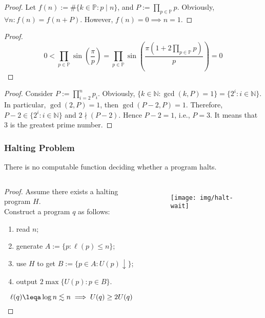\documentclass[UTF8,aspectratio=43,11pt,colorlinks,compress,openany]{beamer}%
\begin{document}
\begin{frame}\frametitle{}
\begin{proof}
Let $f(n):=\#\{k\in\mathbb{P}: p\mid n\}$, and $P:=\prod\limits_{p\in\mathbb{P}} p$. Obviously, $\forall n: f(n)=f(n+P)$. However, $f(n)=0\implies n=1$.
\end{proof}
\begin{proof}
\[0<\prod\limits_{p\in\mathbb{P}}\sin\left(\frac{\pi}{p}\right)=\prod\limits_{p\in\mathbb{P}}\sin\left(\frac{\pi\left(1+2\prod\limits_{p\in\mathbb{P}}p\right)}{p}\right)=0\]
\end{proof}
\begin{proof}
Consider $P:=\prod\limits_{i=2}^n p_i$. Obviously, $\{k\in\mathbb{N}: \gcd(k,P)=1\}=\{2^i: i\in\mathbb{N}\}$. In particular, $\gcd(2,P)=1$, then $\gcd(P-2,P)=1$. Therefore, $P-2\in\{2^i: i\in\mathbb{N}\}$ and $2\nmid(P-2)$. Hence $P-2=1$, i.e., $P=3$. It means that $3$ is the greatest prime number.
\end{proof}
\end{frame}

\begin{frame}\frametitle{Halting Problem}
	\setlength\abovedisplayskip{0pt}
	\setlength\belowdisplayskip{0pt}
	\begin{theorem}
		There is no computable function deciding whether a program halts.
	\end{theorem}
\begin{columns}
\begin{proof}
	Assume there exists a halting program $H$.\\
	Construct a program $q$ as follows: 
	\begin{enumerate}
		\item read $n$;
		\item generate $A:=\{p:\ell(p)\leq n\}$;
		\item use $H$ to get $B:=\{p\in A: U(p)\downarrow\}$;
		\item output $2\max\{U(p): p\in B\}$.
	\end{enumerate}
\[\ell(q)\leqa\log n\lesssim n\implies U(q)\geq 2U(q)\]
\end{proof}
\begin{figure}[H]
	\texttt{[image: img/halt-wait]}
\end{figure}
\end{columns}
\end{frame}
\end{document}
